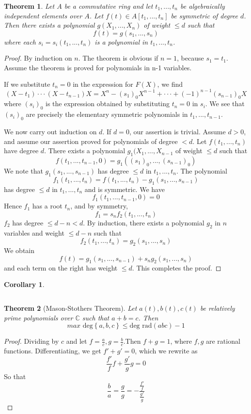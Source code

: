 \documentclass{book}
\newtheorem{theorem}{Theorem}[section]
\newtheorem{corollary}{Corollary}[theorem]
\theoremstyle{definition}
\begin{document}
\begin{theorem}
Let $A$ be a commutative ring and let $t_1,...,t_n$ be algebraically independent elements over $A$. Let $f(t)\in A[t_1,...,t_n] $ be symmetric of degree $d$. Then there exists a polynomial $g(X_1,...,X_n)$ of weight $\le d$ such that\[f(t)=g(s_1,...,s_n)\] where each $s_i=s_i(t_1,...,t_n)$ is a polynomial in $t_1,...,t_n$.
\end{theorem}
\begin{proof}
By induction on $n$. The theorem is obvious if $n=1$, because $s_1=t_1$. Assume the theorem is proved for polynomials in n-1 variables.\par
If we substitute $t_n=0$ in the expression for $F(X)$, we find \[(X-t_1)\cdot \cdot \cdot (X-t_{n-1})X=X^n-(s_1)_0X^{n-1}+\cdot \cdot \cdot +(-1)^{n-1}(s_{n-1})_0X\] where $(s_i)_0$ is the expression obtained by substituting $t_n=0$ in $s_i$. We see that $(s_i)_0$ are precisely the elementary symmetric polynomials in $t_1,...,t_{n-1}$.\par
We now carry out induction on $d$. If $d=0$, our assertion is trivial. Assume $d>0$, and assume our assertion proved for polynomials of degree $<d$. Let $f(t_1,...,t_n)$ have degree $d$. There exists a polynomial $g_1(X_1,...,X_{n-1}$ of weight $\le d$ such that \[f(t_1,...,t_{n-1},0)=g_1((s_1)_0,...,(s_{n-1})_0)\]
We note that $g_1(s_1,...,s_{n-1})$ has degree $\le d$ in $t_1,...,t_n$. The polynomial \[f_1(t_1,...,t_n)=f(t_1,...,t_n)-g_1(s_1,...,s_{n-1})\]
has degree $\le d$ in $t_1,...,t_n$ and is symmetric. We have \[f_1(t_1,...,t_{n-1},0)=0\]
Hence $f_1$ has a root $t_n$, and by symmetry, \[f_1=s_nf_2(t_1,...,t_n)\]
$f_2$ has degree $\le d-n < d$. By induction, there exists a polynomial $g_2$ in $n$ variables and weight $\le d-n$ such that \[f_2(t_1,...,t_n)=g_2(s_1,...,s_n)\]
We obtain \[f(t)=g_1(s_1,...,s_{n-1})+s_ng_2(s_1,...,s_n)\] and each term on the right has weight $\le d$. This completes the proof.
\end{proof}
\begin{corollary}
\end{corollary}

\subsection{}
\begin{theorem}[Mason-Stothers Theorem]
Let $a(t),b(t),c(t)$ be relatively prime polynomials over $\mathbb{C}$ such that $a+b=c$. Then \[max \text{ deg}\left \{a,b,c\right \}\le \text{deg} \text{ rad}(abc) -1\]
\end{theorem}
\begin{proof}
 Dividing by $c$ and let $f=\frac{a}{c},g=\frac{b}{c}$.Then $f+g=1$, where $f,g$ are rational functions. Differentiating, we get $f'+g'=0$, which we rewrite as \[\frac{f'}{f}f+\frac{g'}{g}g=0\]
So that \[\frac{b}{a}=\frac{g}{g}=-\frac{\frac{f'}{f}}{\frac{g'}{g}}\]
\end{proof}
\end{document}
